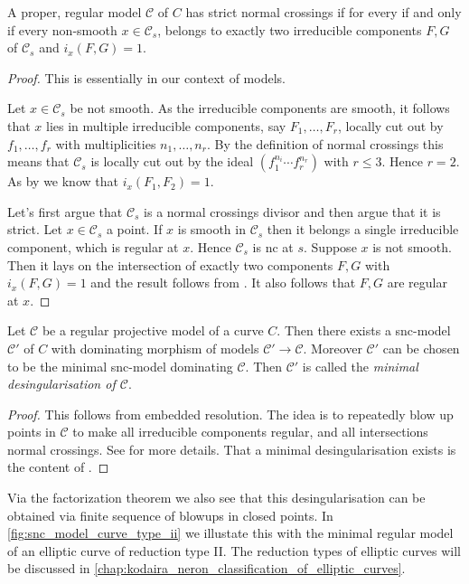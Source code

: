\begin{proposition}
	A proper, regular model $\mathscr C$ of $C$ has strict normal crossings if for every if and only if every non-smooth $x \in \mathscr C_s$, belongs to exactly two irreducible components $F, G$ of $\mathscr C_s$ and $i_x(F, G) = 1$.  
\end{proposition}
\begin{proof}
	This is essentially \cite[prop.\ 9.1.8.(b)]{liuAlgebraicGeometryArithmetic2002} in our context of models. 

	\ltr Let $x \in \mathscr C_s$ be not smooth. 
	As the irreducible components are smooth, it follows that $x$ lies in multiple irreducible components, say $F_1, \ldots, F_r$, locally cut out by $f_1, \ldots, f_r$ with multiplicities $n_1, \ldots, n_r$. 
	By the definition of normal crossings this means that  $\mathscr C_s$ is locally cut out by the ideal $(f_1^{n_i}\cdots f_r^{n_r})$ with $r \le 3$. Hence  $r = 2$. 
	As by \cite[prop.\ 9.1.8.(b)]{liuAlgebraicGeometryArithmetic2002} we know that $i_x(F_1, F_2) = 1$. 

	\rtl Let's first argue that $\mathscr C_s$ is a normal crossings divisor and then argue that it is strict.
	Let $x \in \mathscr C_s$ a point. If $x$ is smooth in $\mathscr C_s$ then it belongs a single irreducible component, which is regular at $x$. 
	Hence $\mathscr C_s$ is nc at $s$. 
	Suppose  $x$ is not smooth. Then it lays on the intersection of exactly two components $F, G$ with $i_x(F, G) = 1$ and the result follows from \cite[prop.\ 9.1.8.(b)]{liuAlgebraicGeometryArithmetic2002}.
	It also follows that $F, G$ are regular at $x$.
\end{proof}

\begin{theorem}\label{thm:desingularisation}
	Let $\mathscr C$ be a regular projective model of a curve $C$.
	Then there exists a snc-model $\mathscr C'$ of $C$ with dominating morphism of models $\mathscr C' \to \mathscr C$. 
	Moreover $\mathscr C'$ can be chosen to be the minimal snc-model dominating $\mathscr C$. 
	Then $\mathscr C'$ is called the \emph{minimal desingularisation of $\mathscr C$}. 
\end{theorem}
\begin{proof}
	This follows from embedded resolution. 
	The idea is to repeatedly blow up points in $\mathscr C$ to make all irreducible components regular, and all intersections normal crossings. 
	See \cite[sec.\ 9.2.4]{liuAlgebraicGeometryArithmetic2002} for more details.
	That a minimal desingularisation exists is the content of \cite[prop.\ 9.3.32]{liuAlgebraicGeometryArithmetic2002}.
\end{proof}
Via the factorization theorem we also see that this desingularisation can be obtained via finite sequence of blowups in closed points. 
In \cref{fig:snc_model_curve_type_ii} we illustate this with the minimal regular model of an elliptic curve of reduction type II. 
The reduction types of elliptic curves will be discussed in \cref{chap:kodaira_neron_classification_of_elliptic_curves}.

